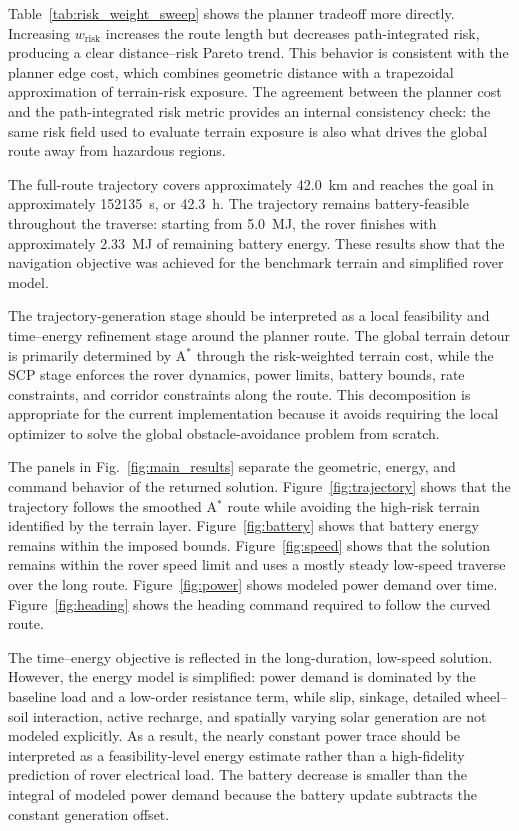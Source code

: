 \documentclass[conf]{new-aiaa}
\begin{document}
Table~\ref{tab:risk_weight_sweep} shows the planner tradeoff more directly. Increasing $w_{\mathrm{risk}}$ increases the route length but decreases path-integrated risk, producing a clear distance--risk Pareto trend. This behavior is consistent with the planner edge cost, which combines geometric distance with a trapezoidal approximation of terrain-risk exposure. The agreement between the planner cost and the path-integrated risk metric provides an internal consistency check: the same risk field used to evaluate terrain exposure is also what drives the global route away from hazardous regions.

The full-route trajectory covers approximately \SI{42.0}{km} and reaches the goal in approximately \SI{152135}{s}, or \SI{42.3}{h}. The trajectory remains battery-feasible throughout the traverse: starting from \SI{5.0}{MJ}, the rover finishes with approximately \SI{2.33}{MJ} of remaining battery energy. These results show that the navigation objective was achieved for the benchmark terrain and simplified rover model.

The trajectory-generation stage should be interpreted as a local feasibility and time--energy refinement stage around the planner route. The global terrain detour is primarily determined by A$^\ast$ through the risk-weighted terrain cost, while the SCP stage enforces the rover dynamics, power limits, battery bounds, rate constraints, and corridor constraints along the route. This decomposition is appropriate for the current implementation because it avoids requiring the local optimizer to solve the global obstacle-avoidance problem from scratch.

The panels in Fig.~\ref{fig:main_results} separate the geometric, energy, and command behavior of the returned solution. Figure~\ref{fig:trajectory} shows that the trajectory follows the smoothed A$^\ast$ route while avoiding the high-risk terrain identified by the terrain layer. Figure~\ref{fig:battery} shows that battery energy remains within the imposed bounds. Figure~\ref{fig:speed} shows that the solution remains within the rover speed limit and uses a mostly steady low-speed traverse over the long route. Figure~\ref{fig:power} shows modeled power demand over time. Figure~\ref{fig:heading} shows the heading command required to follow the curved route.

The time--energy objective is reflected in the long-duration, low-speed solution. However, the energy model is simplified: power demand is dominated by the baseline load and a low-order resistance term, while slip, sinkage, detailed wheel--soil interaction, active recharge, and spatially varying solar generation are not modeled explicitly. As a result, the nearly constant power trace should be interpreted as a feasibility-level energy estimate rather than a high-fidelity prediction of rover electrical load. The battery decrease is smaller than the integral of modeled power demand because the battery update subtracts the constant generation offset.
\end{document}

